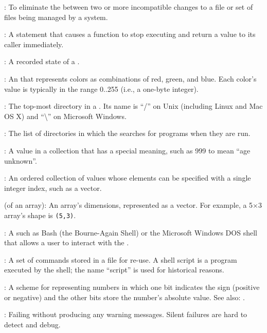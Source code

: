 :
To eliminate the 
between two or more incompatible changes to a file or set of files being
managed by a  system.

:
A statement that causes a function to stop
executing and return a value to its caller immediately.

:
A recorded state of a
.

:
An  that represents colors
as combinations of red, green, and blue. Each color's value is typically
in the range 0..255 (i.e., a one-byte integer).

:
The top-most directory in a
. Its name is ``/'' on Unix
(including Linux and Mac OS X) and ``\textbackslash{}'' on Microsoft
Windows.
 
:
The list of directories in which the  searches for programs when they are run.

:
A value in a collection that has a special
meaning, such as 999 to mean ``age unknown''.

:
An ordered collection of values whose elements can be
specified with a single integer index, such as a vector.

 (of an array):
An array's dimensions, represented as a
vector. For example, a 5${\times}$3 array's shape is \texttt{(5,3)}.

:
A  such as Bash
(the Bourne-Again Shell) or the Microsoft Windows DOS shell that allows
a user to interact with the .

:
A set of  commands
stored in a file for re-use. A shell script is a program executed by the
shell; the name ``script'' is used for historical reasons.
 
:
A scheme for representing numbers in which one bit indicates the sign (positive or negative)
and the other bits store the number's absolute value.
See also: .

:
Failing without producing any warning messages.
Silent failures are hard to detect and debug.

